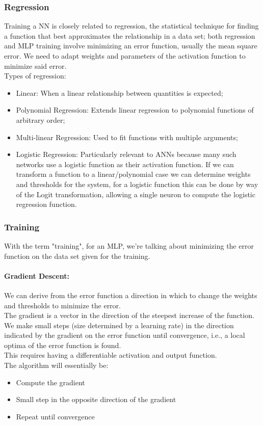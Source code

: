 \documentclass{article}
\begin{document}
	\subsubsection{Regression}
	Training a NN is closely related to regression, the statistical technique for finding a function that best approximates the relationship in a data set; both regression and MLP training involve minimizing an error function, usually the mean square error. We need to adapt weights and parameters of the activation function to minimize said error.\\
	
	Types of regression: 
	\begin{itemize}
		\item Linear: When a linear relationship between quantities is expected;
		\item Polynomial Regression: Extends linear regression to polynomial functions of arbitrary order;
		\item Multi-linear Regression: Used to fit functions with multiple arguments;
		\item Logistic Regression: Particularly relevant to ANNs because many such networks use a logistic function as their activation function. If we can transform a function to a linear/polynomial case we can determine weights and thresholds for the system, for a logistic function this can be done by way of the Logit transformation, allowing a single neuron to compute the logistic regression function.
	\end{itemize}
	
	\subsubsection{Training}
	
	With the term "training", for an MLP, we're talking about minimizing the error function on the data set given for the training.\\
	
	\paragraph{Gradient Descent:} We can derive from the error function a direction in which to change the weights and thresholds to minimize the error.\\
	The gradient is a vector in the direction of the steepest increase of the function.\\
	We make small steps (size determined by a learning rate) in the direction indicated by the gradient on the error function until convergence, i.e., a local optima of the error function is found.\\
	This requires having a differentiable activation and output function.\\
	The algorithm will essentially be: 
	\begin{itemize}
		\item Compute the gradient
		\item Small step in the opposite direction of the gradient
		\item Repeat until convergence
	\end{itemize}
	
\end{document}
